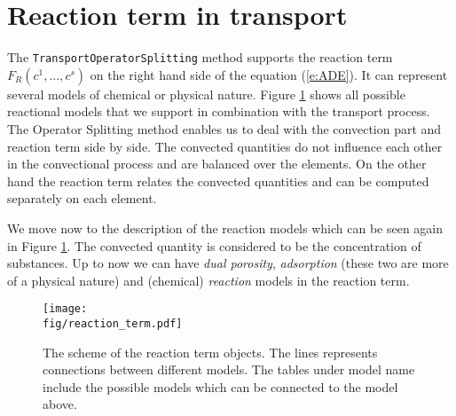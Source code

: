 \def\abs#1{\lvert#1\rvert}
\def\argdot{{\hspace{0.18em}\cdot\hspace{0.18em}}}
\def\avg#1{\left\{#1\right\}_\omega}
\def\D{{\tn D}}
\def\div{\operatorname{div}}
\def\Eh{\mathcal E_h}       %
\def\Ehcom{\mathcal E_{h,C}}         %
\def\Ehdir{\mathcal E_{h,D}}         %
\def\Ehint{\mathcal E_{h,I}}       %
\def\grad{\nabla}
\def\jmp#1{[#1]}
\def\n{\vc n}
\def\vc#1{\mathbf{\boldsymbol{#1}}}     %
\def\R{\mathbb R}
\def\sc#1#2{\left(#1,#2\right)}
\def\Th{\mathcal T_h}       %
\def\th{\vartheta}
\def\tn#1{{\mathbb{#1}}}    %
\def\Tr{\operatorname{Tr}}
\def\where{\,|\,}

\section{Reaction term in transport}
\label{sec:reaction_term}

The {\tt TransportOperatorSplitting} method supports the reaction term $F_R(c^1,\ldots,c^s)$ on the right hand side of the equation (\ref{e:ADE}).
It can represent several models of chemical or physical nature. 
Figure \ref{fig:reaction_term} shows all possible reactional models that we support in combination with the transport process. The Operator Splitting method enables 
us to deal with the convection part and reaction term side by side. The convected quantities do not influence each other in the convectional
process and are balanced over the elements. On the other hand the reaction term relates the convected quantities and can be computed 
separately on each element.

We move now to the description of the reaction models which can be seen again in Figure \ref{fig:reaction_term}. 
The convected quantity is considered to be the concentration of substances. 
Up to now we can have \emph{dual porosity}, \emph{adsorption} (these two are more of a physical nature) and (chemical) \emph{reaction} models in the reaction term. 

\begin{figure}
  \centering
  \texttt{[image: \\fig/reaction\_term.pdf]}
  \caption{The scheme of the reaction term objects. The lines represents connections between different models. 
  The tables under model name include the possible models which can be connected to the model above.}
  \label{fig:reaction_term}
\end{figure}

